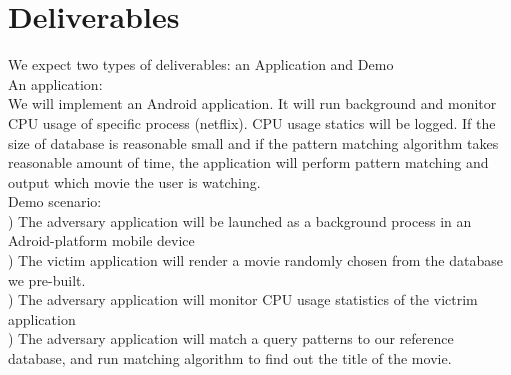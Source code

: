 \section{Deliverables}
\label{sec:deliverables}
We expect two types of deliverables: an Application and Demo\\
\indent An application: \\
We will implement an Android application.
It will run background and monitor CPU usage of specific process (netflix).
CPU usage statics will be logged.
If the size of database is reasonable small and if the pattern matching algorithm takes reasonable amount of time, 
the application will perform pattern matching and output which movie the user is watching. 
\\
Demo scenario: \\
) The adversary application will be launched as a background process in an Adroid-platform mobile device\\
) The victim application will render a movie randomly chosen from the database we pre-built. \\
) The adversary application will monitor CPU usage statistics of the victrim application\\
) The adversary application will match a query patterns to our reference database, and run matching algorithm to find out the title of the movie.\\



